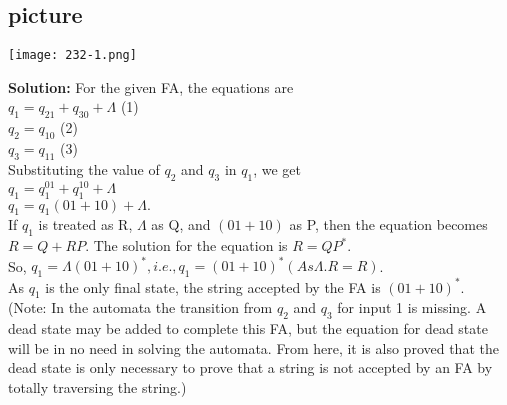 \documentclass[9pt]{article}
\begin{document}
\begin{center}
\section{picture}
\texttt{[image: 232-1.png]}
\end{center}


\textbf{Solution:} For the given FA, the equations are\\

\vspace*{0.1cm}
\hspace*{4cm} $q_1 = q_21 + q_30 + \Lambda$  \hspace*{3.4cm}  (1) \\
\hspace*{4cm} $q_2 = q_10$  \hspace*{4.7cm}  (2) \\
\hspace*{4cm} $q_3 = q_11$  \hspace*{4.7cm}  (3) \\


\hspace*{0.3cm} Substituting the value of $q_2$ and $q_3$ in $q_1$, we get\\

\vspace*{0.1cm}
\hspace*{4cm} $q_1 = q_1^01 + q_1^10 + \Lambda$ \\
\hspace*{4cm} $q_1 = q_1(01 + 10) + \Lambda.$ \\

\vspace*{0.1cm}
If $q_1$ is treated as R, $\Lambda$ as Q, and $(01 + 10)$ as P, then the equation becomes $R = Q + RP$.
The solution for the equation is $R = QP^*$.\\

\vspace*{0.1cm}
So, \hspace*{1.5cm}  $q_1 = \Lambda(01 + 10)^*, i.e., q_1 = (01 + 10)^* (As \Lambda.R = R)$.\\

\vspace*{0.1cm}
\hspace*{0.5cm} As $q_1$ is the only final state, the string accepted by the FA is $(01 + 10)^*$.\\

\hspace*{0.5cm}(Note: In the automata the transition from $q_2$ and $q_3$ for input 1 is missing. A dead state may be added
to complete this FA, but the equation for dead state will be in no need in solving the automata. From
here, it is also proved that the dead state is only necessary to prove that a string is not accepted by an FA
by totally traversing the string.)\\
\end{document}
